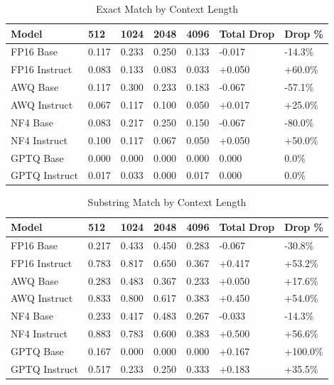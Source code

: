 \documentclass[11pt,a4paper]{article}
\begin{document}
\begin{table}[H]
\centering
\caption{Exact Match by Context Length}
\small
\begin{tabularx}{\textwidth}{@{}X C{1.5cm} C{1.5cm} C{1.5cm} C{1.5cm} C{2cm} C{2cm}@{}}
\toprule
\textbf{Model} & \textbf{512} & \textbf{1024} & \textbf{2048} & \textbf{4096} & \textbf{Total Drop} & \textbf{Drop \%} \\
\midrule
FP16 Base & 0.117 & 0.233 & 0.250 & 0.133 & -0.017 & -14.3\% \\
FP16 Instruct & 0.083 & 0.133 & 0.083 & 0.033 & +0.050 & +60.0\% \\
AWQ Base & 0.117 & 0.300 & 0.233 & 0.183 & -0.067 & -57.1\% \\
AWQ Instruct & 0.067 & 0.117 & 0.100 & 0.050 & +0.017 & +25.0\% \\
NF4 Base & 0.083 & 0.217 & 0.250 & 0.150 & -0.067 & -80.0\% \\
NF4 Instruct & 0.100 & 0.117 & 0.067 & 0.050 & +0.050 & +50.0\% \\
GPTQ Base & 0.000 & 0.000 & 0.000 & 0.000 & 0.000 & 0.0\% \\
GPTQ Instruct & 0.017 & 0.033 & 0.000 & 0.017 & 0.000 & 0.0\% \\
\bottomrule
\end{tabularx}
\end{table}

\begin{table}[H]
\centering
\caption{Substring Match by Context Length}
\small
\begin{tabularx}{\textwidth}{@{}X C{1.5cm} C{1.5cm} C{1.5cm} C{1.5cm} C{2cm} C{2cm}@{}}
\toprule
\textbf{Model} & \textbf{512} & \textbf{1024} & \textbf{2048} & \textbf{4096} & \textbf{Total Drop} & \textbf{Drop \%} \\
\midrule
FP16 Base & 0.217 & 0.433 & 0.450 & 0.283 & -0.067 & -30.8\% \\
FP16 Instruct & 0.783 & 0.817 & 0.650 & 0.367 & +0.417 & +53.2\% \\
AWQ Base & 0.283 & 0.483 & 0.367 & 0.233 & +0.050 & +17.6\% \\
AWQ Instruct & 0.833 & 0.800 & 0.617 & 0.383 & +0.450 & +54.0\% \\
NF4 Base & 0.233 & 0.417 & 0.483 & 0.267 & -0.033 & -14.3\% \\
NF4 Instruct & 0.883 & 0.783 & 0.600 & 0.383 & +0.500 & +56.6\% \\
GPTQ Base & 0.167 & 0.000 & 0.000 & 0.000 & +0.167 & +100.0\% \\
GPTQ Instruct & 0.517 & 0.233 & 0.250 & 0.333 & +0.183 & +35.5\% \\
\bottomrule
\end{tabularx}
\end{table}
\end{document}
